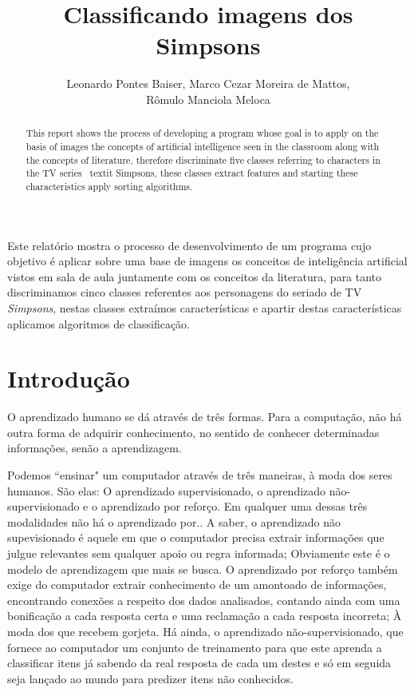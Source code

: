 \documentclass[12pt]{article}
\title{Classificando imagens dos Simpsons}
\author{Leonardo Pontes Baiser\inst{1}, Marco Cezar Moreira de Mattos\inst{1},\\
		Rômulo Manciola Meloca\inst{1}}
\begin{document}
	
\maketitle

\begin{abstract}

	This report shows the process of developing a program whose goal is to apply on the basis of images the 	concepts of artificial intelligence seen in the classroom along with the concepts of literature, therefore discriminate five classes referring to characters in the TV series \ textit {Simpsons}, these classes extract features and starting these characteristics apply sorting algorithms.

	\end{abstract}
     
\begin{resumo} 
  Este relatório mostra o processo de desenvolvimento de um programa cujo objetivo é aplicar sobre uma base de imagens os conceitos de inteligência artificial vistos em sala de aula juntamente com os conceitos da literatura, para tanto discriminamos cinco classes referentes aos personagens do seriado de TV \textit{Simpsons}, nestas classes extraímos características e apartir destas características aplicamos algoritmos de classificação.	
\end{resumo}

\section{Introdução}\label{sec:introducao}


	O aprendizado humano se dá através de três formas.
	Para a computação, não há outra forma de adquirir conhecimento, no sentido de conhecer determinadas informações, senão a aprendizagem.

	Podemos ``ensinar" um computador através de três maneiras, à moda dos seres humanos. São elas: O aprendizado supervisionado, o aprendizado não-supervisionado e o aprendizado por reforço. Em qualquer uma dessas três modalidades não há o aprendizado por..
	A saber, o aprendizado não supevisionado é aquele em que o computador precisa extrair informações que julgue relevantes sem qualquer apoio ou regra informada; Obviamente este é o modelo de aprendizagem que mais se busca. O aprendizado por reforço também exige do computador extrair conhecimento de um amontoado de informações, encontrando conexões a respeito dos dados analisados, contando ainda com uma bonificação a cada resposta certa e uma reclamação a cada resposta incorreta; À moda dos que recebem gorjeta. Há ainda, o aprendizado não-supervisionado, que fornece ao computador um conjunto de treinamento para que este aprenda a classificar itens já sabendo da real resposta de cada um destes e só em seguida seja lançado ao mundo para predizer itens não conhecidos.
\end{document}
